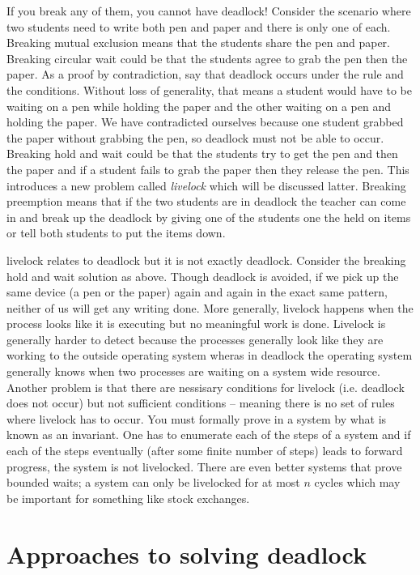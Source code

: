 If you break any of them, you cannot have deadlock! Consider the scenario where two students need to write both pen and paper and there is only one of each. Breaking mutual exclusion means that the students share the pen and paper. Breaking circular wait could be that the students agree to grab the pen then the paper. As a proof by contradiction, say that deadlock occurs under the rule and the conditions. Without loss of generality, that means a student would have to be waiting on a pen while holding the paper and the other waiting on a pen and holding the paper. We have contradicted ourselves because one student grabbed the paper without grabbing the pen, so deadlock must not be able to occur. Breaking hold and wait could be that the students try to get the pen and then the paper and if a student fails to grab the paper then they release the pen. This introduces a new problem called \textit{livelock} which will be discussed latter. Breaking preemption means that if the two students are in deadlock the teacher can come in and break up the deadlock by giving one of the students one the held on items or tell both students to put the items down.

\gls{livelock} relates to deadlock but it is not exactly deadlock. Consider the breaking hold and wait solution as above. Though deadlock is avoided, if we pick up the same device (a pen or the paper) again and again in the exact same pattern, neither of us will get any writing done. More generally, livelock happens when the process looks like it is executing but no meaningful work is done. Livelock is generally harder to detect because the processes generally look like they are working to the outside operating system wheras in deadlock the operating system generally knows when two processes are waiting on a system wide resource. Another problem is that there are nessisary conditions for livelock (i.e. deadlock does not occur) but not sufficient conditions -- meaning there is no set of rules where livelock has to occur. You must formally prove in a system by what is known as an invariant. One has to enumerate each of the steps of a system and if each of the steps eventually (after some finite number of steps) leads to forward progress, the system is not livelocked. There are even better systems that prove bounded waits; a system can only be livelocked for at most $n$ cycles which may be important for something like stock exchanges.

\section{Approaches to solving deadlock}


